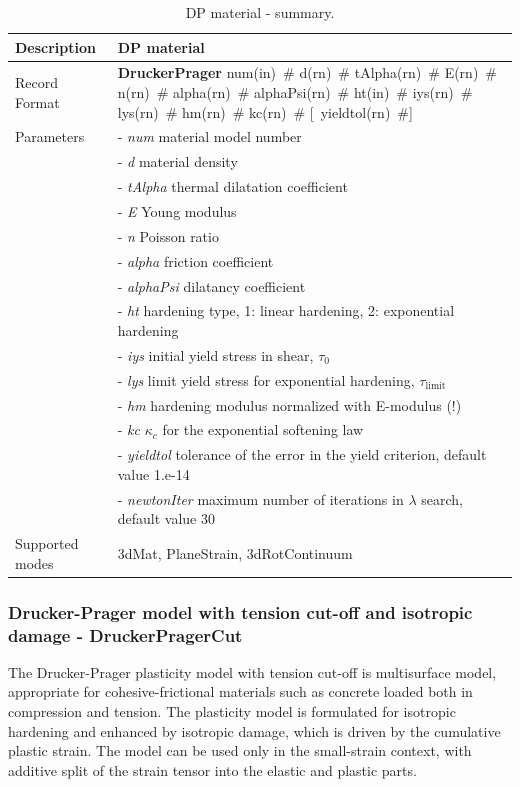 \documentclass[a4paper]{article}
\newcommand{\descitem}[1]{{\noindent \bf #1}}
\newcommand{\elemparam}[2]{{{#1\tiny (#2)}~\#}}
\newcommand{\optelemparam}[2]{[{~\elemparam{#1}{#2}}]}
\newcommand{\param}[1]{{\it #1}}
\begin{document}
\begin{table}[!htb]
\begin{tabular}{|l|p{9cm}|}
\hline
Description & DP material\\
\hline
Record Format & \descitem{DruckerPrager} \elemparam{num}{in}
\elemparam{d}{rn} \elemparam{tAlpha}{rn} \elemparam{E}{rn} \elemparam{n}{rn}
\elemparam{alpha}{rn} \elemparam{alphaPsi}{rn} \elemparam{ht}{in}
\elemparam{iys}{rn} \elemparam{lys}{rn} \elemparam{hm}{rn} \elemparam{kc}{rn} \optelemparam{yieldtol}{rn} \\
Parameters &- \param{num} material model number\\
&- \param{d} material density\\
&- \param{tAlpha} thermal dilatation coefficient\\
&- \param{E} Young modulus\\
&- \param{n} Poisson ratio\\
&- \param{alpha} friction coefficient\\
&- \param{alphaPsi}  dilatancy coefficient\\
&- \param{ht} hardening type, 1: linear hardening, 2: exponential
hardening\\
&- \param{iys} initial yield stress in shear, $\tau_0$\\
&- \param{lys} limit yield stress for exponential hardening, $\tau_{\mathrm{limit}}$\\
&- \param{hm} hardening modulus normalized with E-modulus (!)\\
&- \param{kc} $\kappa_c$ for the exponential softening law\\
&- \param{yieldtol} tolerance of the error in the yield criterion, default value
1.e-14\\
&- \param{newtonIter} maximum number of iterations in $\lambda$ search, default value 30\\
Supported modes& 3dMat, PlaneStrain, 3dRotContinuum\\
\hline
\end{tabular}
\caption{DP material - summary.}
\label{DP_table}
\end{table}

\subsubsection{Drucker-Prager model with tension cut-off and isotropic damage - DruckerPragerCut}
\label{DPCutmodel}
The Drucker-Prager plasticity model with tension cut-off is multisurface model, appropriate for cohesive-frictional materials such as concrete loaded both in compression and tension. The plasticity model is formulated for isotropic hardening and enhanced by isotropic damage, which is driven by the cumulative plastic strain. The model can be used only in the small-strain context, with additive split of the strain tensor into the elastic and plastic parts.
\end{document}
